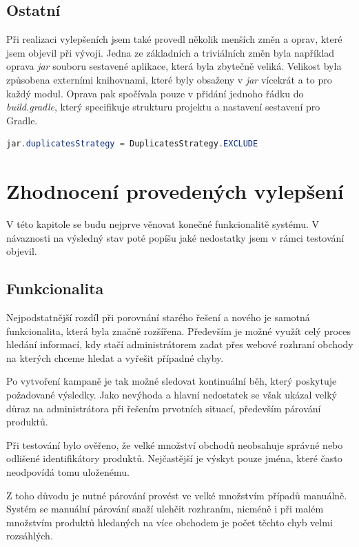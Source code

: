 \documentclass[thesis=B,czech]{FITthesis}[2012/06/26]
\begin{document}
\section{Ostatní}
Při realizaci vylepšeních jsem také provedl několik menších změn a oprav, které jsem objevil při vývoji. Jedna ze základních a triviálních
změn byla například oprava \textit{jar} souboru sestavené aplikace, která byla zbytečně veliká. Velikost byla způsobena externími knihovnami,
které byly obsaženy v \textit{jar} vícekrát a to pro každý modul. Oprava pak spočívala pouze v přidání jednoho řádku
do \textit{build.gradle}, který specifikuje strukturu projektu a nastavení sestavení pro Gradle.
\begin{lstlisting}[language=Java, caption={Nastavení sestavení \textit{jar} souboru, aby neduplikoval knihovny na kterých
					jsou moduly závislé.}]
        jar.duplicatesStrategy = DuplicatesStrategy.EXCLUDE
\end{lstlisting}


\chapter{Zhodnocení provedených vylepšení}
V této kapitole se budu nejprve věnovat konečné funkcionalitě systému. V návaznosti na výsledný stav poté popíšu jaké nedostatky jsem v rámci testování objevil.


\section{Funkcionalita}

Nejpodstatnější rozdíl při porovnání starého řešení a nového je samotná funkcionalita, která byla značně rozšířena. Především je možné
využít celý proces hledání informací, kdy stačí administrátorem zadat přes webové rozhraní obchody na kterých chceme hledat
a vyřešit případné chyby.
\par
Po vytvoření kampaně je tak možné sledovat kontinuální běh, který poskytuje požadované výsledky. Jako nevýhoda a hlavní nedostatek
se však ukázal velký důraz na administrátora při řešením prvotních situací, především párování produktů.
\par
Při testování bylo ověřeno, že velké množství obchodů neobsahuje správné nebo odlišené identifikátory produktů. Nejčastější je výskyt pouze jména, které často neodpovídá tomu uloženému.
\par
Z toho důvodu je nutné párování
provést ve velké množstvím případů manuálně. Systém se manuální párování snaží ulehčit rozhraním, nicméně i při malém množstvím produktů
hledaných na více obchodem je počet těchto chyb velmi rozsáhlých. 
\end{document}
